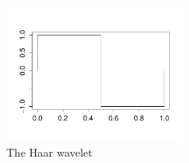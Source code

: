 \begin{figure}[h]
\caption{The Haar wavelet}\label{figure:haar}
\centering
	\includegraphics[height=128pt]{images/haar.pdf}
\end{figure}